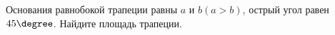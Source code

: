 \begin{ex}
	\begin{condition}
		Основания равнобокой трапеции равны \( a  \) и \( b (a > b )\), острый угол равен \( 45\degree \). Найдите площадь трапеции.
	\end{condition}
\end{ex}